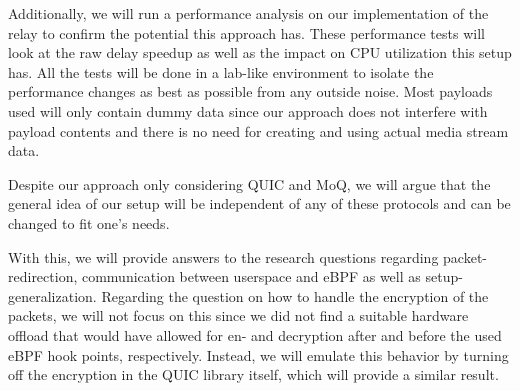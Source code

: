 Additionally, we will run a performance analysis on our implementation of the relay to confirm the potential this 
approach has.
These performance tests will look at the raw delay speedup as well as the impact on CPU utilization this 
setup has.
All the tests will be done in a lab-like environment to isolate the performance changes as best as possible
from any outside noise.
Most payloads used will only contain dummy data since our approach does not interfere with payload contents 
and there is no need for creating and using actual media stream data.

Despite our approach only considering QUIC and MoQ, we will argue that the general idea of our setup will be independent of
any of these protocols and can be changed to fit one's needs.

With this, we will provide answers to the research questions regarding packet-redirection, communication between userspace and eBPF
as well as setup-generalization.
Regarding the question on how to handle the encryption of the packets, we will not focus on this since we did not find a suitable
hardware offload that would have allowed for en- and decryption after and before the used eBPF hook points, respectively.
Instead, we will emulate this behavior by turning off the encryption in the QUIC library itself, which will provide a similar result.

